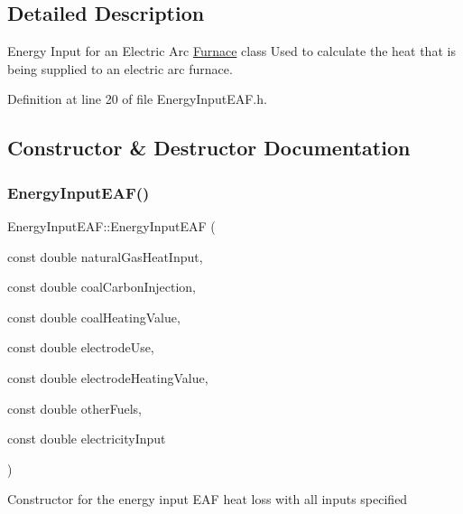 \subsection{Detailed Description}
Energy Input for an Electric Arc \hyperlink{class_furnace}{Furnace} class Used to calculate the heat that is being supplied to an electric arc furnace. 

Definition at line 20 of file Energy\+Input\+E\+A\+F.\+h.



\subsection{Constructor \& Destructor Documentation}
\mbox{\label{class_energy_input_e_a_f_a385f7047f5019124d7559cdbcb229a04}} 
\subsubsection{\texorpdfstring{Energy\+Input\+E\+A\+F()}{EnergyInputEAF()}\hspace{0.1cm}{\footnotesize\ttfamily [1/3]}}
{\footnotesize\ttfamily Energy\+Input\+E\+A\+F\+::\+Energy\+Input\+E\+AF (\begin{DoxyParamCaption}\item[{const double}]{natural\+Gas\+Heat\+Input,  }\item[{const double}]{coal\+Carbon\+Injection,  }\item[{const double}]{coal\+Heating\+Value,  }\item[{const double}]{electrode\+Use,  }\item[{const double}]{electrode\+Heating\+Value,  }\item[{const double}]{other\+Fuels,  }\item[{const double}]{electricity\+Input }\end{DoxyParamCaption})\hspace{0.3cm}{\ttfamily [inline]}}

Constructor for the energy input E\+AF heat loss with all inputs specified


